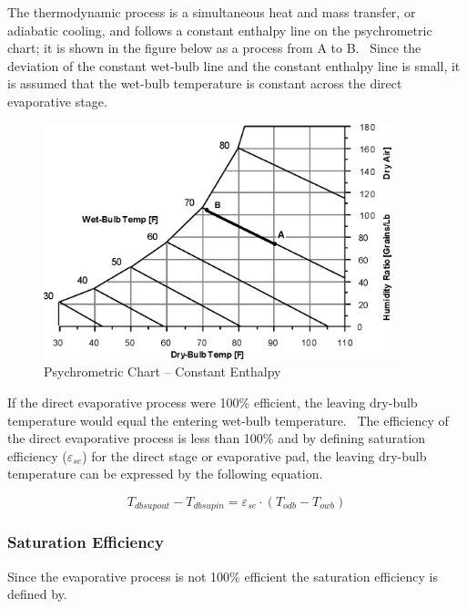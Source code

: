 The thermodynamic process is a simultaneous heat and mass transfer, or adiabatic cooling, and follows a constant enthalpy line on the psychrometric chart; it is shown in the figure below as a process from A to B.~ Since the deviation of the constant wet-bulb line and the constant enthalpy line is small, it is assumed that the wet-bulb temperature is constant across the direct evaporative stage.

\begin{figure}[hbtp] %
\centering
\includegraphics[width=0.9\textwidth, height=0.9\textheight, keepaspectratio=true]{media/image4790.png}
\caption{Psychrometric Chart -- Constant Enthalpy \protect \label{fig:psychrometric-chart-constant-enthalpy}}
\end{figure}

If the direct evaporative process were 100\% efficient, the leaving dry-bulb temperature would equal the entering wet-bulb temperature.~ The efficiency of the direct evaporative process is less than 100\% and by defining saturation efficiency (\(\varepsilon_{se}\)) for the direct stage or evaporative pad, the leaving dry-bulb temperature can be expressed by the following equation.

\begin{equation}
{T_{dbsupout}} - {T_{dbsupin}} = {\varepsilon_{se}} \cdot \left( {{T_{odb}} - {T_{owb}}} \right)
\end{equation}

\subsubsection{Saturation Efficiency}\label{saturation-efficiency}

Since the evaporative process is not 100\% efficient the saturation efficiency is defined by.

